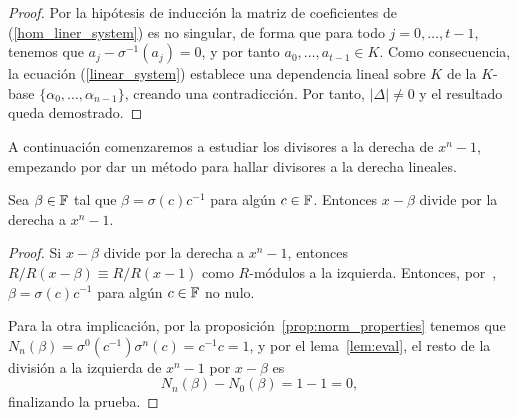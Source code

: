 \begin{proof}
Por la hipótesis de inducción la matriz de coeficientes de (\ref{hom_liner_system}) es no singular, de forma que para todo \(j = 0, \dots, t-1\), tenemos que \(a_j - \sigma^{-1}(a_j) = 0\), y por tanto \(a_0, \dots, a_{t-1} \in K\). Como consecuencia, la ecuación (\ref{linear_system}) establece una dependencia lineal sobre  \(K\) de la  \(K\)-base  \(\{\alpha_0, \dots, \alpha_{n-1}\}\), creando una contradicción. Por tanto, \(|\Delta| \neq 0\) y el resultado queda demostrado.
\end{proof}

A continuación comenzaremos a estudiar los divisores a la derecha de \(x^{n} -1\), empezando por dar un método para hallar divisores a la derecha lineales.

\begin{proposition}
\label{prop:linear_div}
    Sea \(\beta \in \mathbb{F}\) tal que \(\beta = \sigma(c)c^{-1}\) para algún \(c \in \mathbb{F}\). Entonces \(x - \beta\) divide por la derecha a \(x^{n}-1\).
\end{proposition}
\begin{proof}
Si \(x - \beta\) divide por la derecha a  \(x^{n} -1\), entonces \(R / R(x - \beta) \equiv R / R(x-1)\) como \(R\)-módulos a la izquierda. Entonces, por~\cite[Proposición 2.4]{Leroy95pseudolinear}, \(\beta = \sigma(c)c^{-1}\) para algún \(c \in \mathbb{F}\) no nulo.

Para la otra implicación, por la proposición~\ref{prop:norm_properties} tenemos que \(N_n(\beta) = \sigma^{0}(c^{-1})\sigma^{n}(c) = c^{-1}c = 1\), y por el lema~\ref{lem:eval}, el resto de la división a la izquierda de \(x^{n} - 1\) por \(x - \beta\) es
    \[
    N_n(\beta) - N_0(\beta) = 1 - 1 = 0
    ,\]
finalizando la prueba.



\end{proof}

